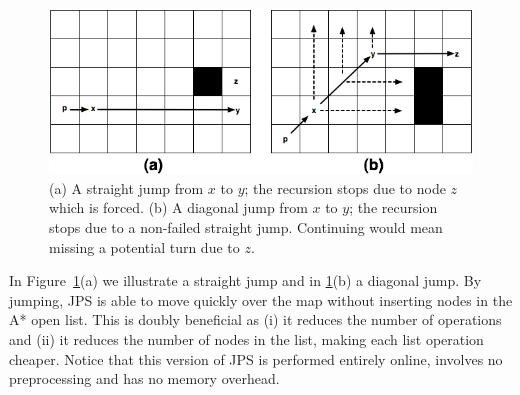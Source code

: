 \begin{figure}[tb]
       \begin{center}
		   \includegraphics[width=0.95\columnwidth]
			{diagrams/jumping.png}
       \end{center}
	\vspace{-3pt}
       \caption{(a) A straight jump from $x$ to $y$; the recursion stops due to node $z$ which is forced.
(b) A diagonal jump from $x$ to $y$; the recursion stops due to a non-failed straight jump. Continuing 
would mean missing a potential turn due to $z$.}
       \label{fig:jumping}
\end{figure}

In Figure~\ref{fig:jumping}(a) we illustrate a straight jump and in \ref{fig:jumping}(b) a diagonal jump. 
By jumping, JPS is able to move quickly over the map 
without inserting nodes in the A* open list.
This is doubly beneficial as (i) it reduces the number of operations 
and (ii) it reduces the number of nodes in the list, 
making each list operation cheaper.  
Notice that this version of JPS is performed entirely online, involves no preprocessing and has no memory overhead.  

